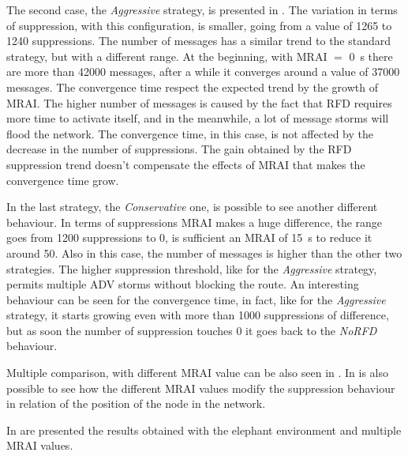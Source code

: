 The second case, the \textit{Aggressive} strategy, is presented in
.
The variation in terms of suppression, with this configuration, is smaller,
going from a value of \num{1265} to \num{1240} suppressions.
The number of messages has a similar trend to the standard strategy, but with
a different range.
At the beginning, with \ac{MRAI} $=$ \SI{0}{\second} there are more than \num{42000}
messages, after a while it converges around a value of \num{37000} messages.
The convergence time respect the expected trend by the growth of \ac{MRAI}.
The higher number of messages is caused by the fact that \ac{RFD} requires more time
to activate itself, and in the meanwhile, a lot of message storms will flood the
network.
The convergence time, in this case, is not affected by the decrease in the number
of suppressions.
The gain obtained by the \ac{RFD} suppression trend doesn't compensate the
effects of \ac{MRAI} that makes the convergence time grow.

In the last strategy, the \textit{Conservative} one, is possible to see another
different behaviour.
In terms of suppressions \ac{MRAI} makes a huge difference, the range goes from \num{1200}
suppressions to \num{0}, is sufficient an \ac{MRAI} of \SI{15}{\second} to reduce
it around \num{50}.
Also in this case, the number of messages is higher than the other two strategies.
The higher suppression threshold, like for the \textit{Aggressive} strategy, permits
multiple \ac{ADV} storms without blocking the route.
An interesting behaviour can be seen for the convergence time, in fact, like for
the \textit{Aggressive} strategy, it starts growing even with more than \num{1000}
suppressions of difference, but as soon the number of suppression touches \num{0}
it goes back to the \textit{NoRFD} behaviour.

Multiple comparison, with different \ac{MRAI} value can be also seen in
.
In  is also possible to see how the different
\ac{MRAI} values modify the suppression behaviour in relation of the position of
the node in the network.

In  are presented the results obtained
with the elephant environment and multiple \ac{MRAI} values.

